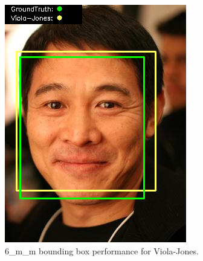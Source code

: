 \documentclass{l4proj}
\begin{document}
\begin{appendices}
\begin{figure}[h!]
  \centering
  \begin{minipage}{0.49\textwidth}
    \centering
     \includegraphics[width=\textwidth]{images/appendix/viola/6.png}
    \caption{6\_m\_m bounding box performance for Viola-Jones.}
    \label{whoopi_result}
  \end{minipage}
    \hfill
    \begin{minipage}{0.49\textwidth}
    \centering

\end{minipage}
\end{figure}
\end{appendices}
\end{document}
